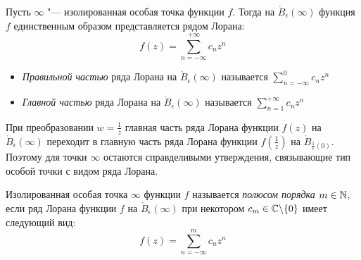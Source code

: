 \begin{unnecessary}
    \begin{definition}
    	Пусть $\infty$ "--- изолированная особая точка функции $f$. Тогда на $\mathring B_\epsilon(\infty)$ функция $f$ единственным образом представляется рядом Лорана:
    	\[f(z) = \sum_{n = -\infty}^{+\infty}c_nz^n\]
    	\begin{itemize}
    		\item \textit{Правильной частью} ряда Лорана на $\mathring B_\epsilon(\infty)$ называется $\sum\limits_{n = -\infty}^{0}c_nz^n$
    		\item \textit{Главной частью} ряда Лорана на $\mathring B_\epsilon(\infty)$ называется $\sum\limits_{n = 1}^{+\infty}c_nz^n$
    	\end{itemize}
    \end{definition}
    
    \begin{note}
    	При преобразовании $w = \frac 1z$ главная часть ряда Лорана функции $f(z)$ на $\mathring B_\epsilon(\infty)$ переходит в главную часть ряда Лорана функции $f(\frac 1z)$ на $\mathring B_{\frac1\epsilon(0)}$. Поэтому для точки $\infty$ остаются справделивыми утверждения, связывающие тип особой точки с видом ряда Лорана.
    \end{note}
    
    \begin{definition}
    	Изолированная особая точка $\infty$ функции $f$ называется \textit{полюсом порядка $m \in \mathbb{N}$}, если ряд Лорана функции $f$ на $\mathring B_\epsilon(\infty)$ при некотором $c_{m} \in \mathbb{C} \backslash \{0\}$ имеет следующий вид:
    	\[f(z) = \sum_{n = -\infty}^{m}c_nz^n\]
    \end{definition}
\end{unnecessary}